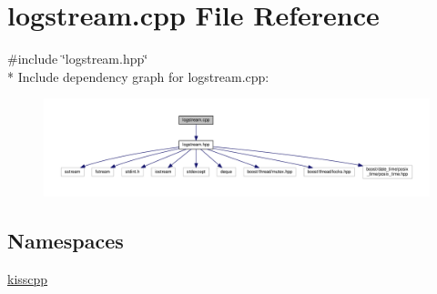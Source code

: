 \hypertarget{a00066}{\section{logstream.\-cpp File Reference}
\label{a00066}
}
{\ttfamily \#include \char`\"{}logstream.\-hpp\char`\"{}}\\*
Include dependency graph for logstream.\-cpp\-:\nopagebreak
\begin{figure}[H]
\begin{center}
\leavevmode
\includegraphics[width=350pt]{a00110}
\end{center}
\end{figure}
\subsection*{Namespaces}
\begin{DoxyCompactItemize}
\item 
\hyperlink{a00089}{kisscpp}
\end{DoxyCompactItemize}
